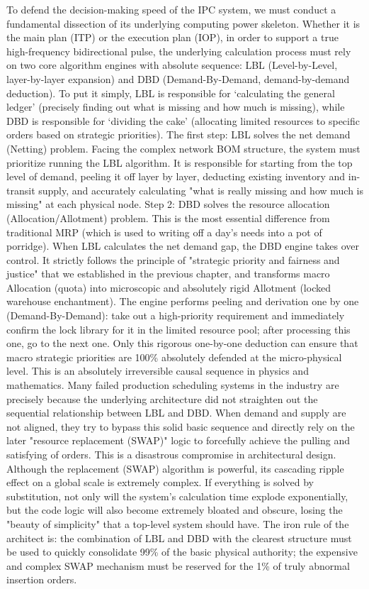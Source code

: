 \documentclass[11pt,a4paper]{article}
\begin{document}
To defend the decision-making speed of the IPC system, we must conduct a fundamental dissection of its underlying computing power skeleton. Whether it is the main plan (ITP) or the execution plan (IOP), in order to support a true high-frequency bidirectional pulse, the underlying calculation process must rely on two core algorithm engines with absolute sequence: LBL (Level-by-Level, layer-by-layer expansion) and DBD (Demand-By-Demand, demand-by-demand deduction). To put it simply, LBL is responsible for ‘calculating the general ledger’ (precisely finding out what is missing and how much is missing), while DBD is responsible for ‘dividing the cake’ (allocating limited resources to specific orders based on strategic priorities). The first step: LBL solves the net demand (Netting) problem. Facing the complex network BOM structure, the system must prioritize running the LBL algorithm. It is responsible for starting from the top level of demand, peeling it off layer by layer, deducting existing inventory and in-transit supply, and accurately calculating "what is really missing and how much is missing" at each physical node. Step 2: DBD solves the resource allocation (Allocation/Allotment) problem. This is the most essential difference from traditional MRP (which is used to writing off a day's needs into a pot of porridge). When LBL calculates the net demand gap, the DBD engine takes over control. It strictly follows the principle of "strategic priority and fairness and justice" that we established in the previous chapter, and transforms macro Allocation (quota) into microscopic and absolutely rigid Allotment (locked warehouse enchantment). The engine performs peeling and derivation one by one (Demand-By-Demand): take out a high-priority requirement and immediately confirm the lock library for it in the limited resource pool; after processing this one, go to the next one. Only this rigorous one-by-one deduction can ensure that macro strategic priorities are 100\% absolutely defended at the micro-physical level. This is an absolutely irreversible causal sequence in physics and mathematics. Many failed production scheduling systems in the industry are precisely because the underlying architecture did not straighten out the sequential relationship between LBL and DBD. When demand and supply are not aligned, they try to bypass this solid basic sequence and directly rely on the later "resource replacement (SWAP)" logic to forcefully achieve the pulling and satisfying of orders. This is a disastrous compromise in architectural design. Although the replacement (SWAP) algorithm is powerful, its cascading ripple effect on a global scale is extremely complex. If everything is solved by substitution, not only will the system's calculation time explode exponentially, but the code logic will also become extremely bloated and obscure, losing the "beauty of simplicity" that a top-level system should have. The iron rule of the architect is: the combination of LBL and DBD with the clearest structure must be used to quickly consolidate 99\% of the basic physical authority; the expensive and complex SWAP mechanism must be reserved for the 1\% of truly abnormal insertion orders.
\end{document}
